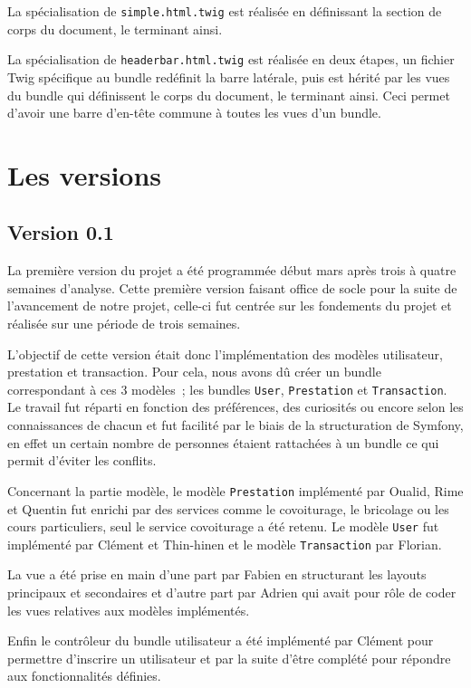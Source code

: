 La spécialisation de \verb|simple.html.twig| est réalisée en définissant la section de corps du document, le terminant ainsi.

La spécialisation de \verb|headerbar.html.twig| est réalisée en deux étapes, un fichier Twig spécifique au bundle redéfinit la barre latérale, puis est hérité par les vues du bundle qui définissent le corps du document, le terminant ainsi. Ceci permet d'avoir une barre d'en-tête commune à toutes les vues d'un bundle.

\section{Les versions}

\subsection{Version 0.1}

La première version du projet a été programmée début mars après trois à quatre semaines d'analyse. Cette première version faisant office de socle pour la suite de l'avancement de notre projet, celle-ci fut centrée sur les fondements du projet et réalisée sur une période de trois semaines.

L'objectif de cette version était donc l'implémentation des modèles utilisateur, prestation et transaction. Pour cela, nous avons dû créer un bundle correspondant à ces 3 modèles~; les bundles \verb|User|, \verb|Prestation| et \verb|Transaction|. Le travail fut réparti en fonction des préférences, des curiosités ou encore selon les connaissances de chacun et fut facilité par le biais de la structuration de Symfony, en effet un certain nombre de personnes étaient rattachées à un bundle ce qui permit d'éviter les conflits.

Concernant la partie modèle, le modèle \verb|Prestation| implémenté par Oualid, Rime et Quentin fut enrichi par des services comme le covoiturage, le bricolage ou les cours particuliers, seul le service covoiturage a été retenu. Le modèle \verb|User| fut implémenté par Clément et Thin-hinen et le modèle \verb|Transaction| par Florian.

La vue a été prise en main d’une part par Fabien en structurant les layouts principaux et secondaires et d’autre part par Adrien qui avait pour rôle de coder les vues relatives aux modèles implémentés.

Enfin le contrôleur du bundle utilisateur a été implémenté par Clément pour permettre d’inscrire un utilisateur et par la suite d’être complété pour répondre aux fonctionnalités définies.

